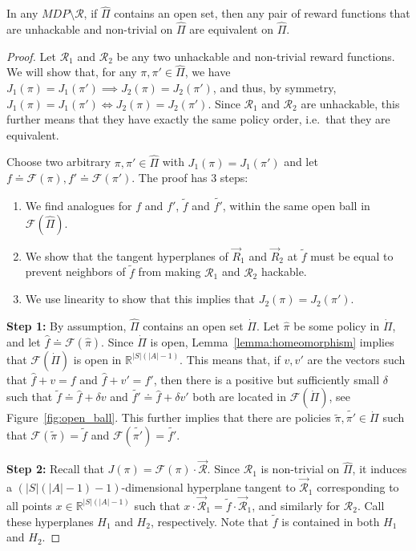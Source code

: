 \begin{theorem} %
In any $MDP \setminus \mathcal{R}$, if $\hat{\Pi}$ contains an open set, then any pair of reward functions that are unhackable and non-trivial on $\hat{\Pi}$ are equivalent on $\hat{\Pi}$.
\end{theorem}
\begin{proof}

Let $\mathcal{R}_1$ and $\mathcal{R}_2$ be any two unhackable and non-trivial reward functions.
We will show that, for any $\pi, \pi' \in \hat{\Pi}$, we have $J_1(\pi) = J_1(\pi') \implies J_2(\pi) = J_2(\pi')$, and thus, by symmetry, $J_1(\pi) = J_1(\pi') \iff J_2(\pi) = J_2(\pi')$.
Since $\mathcal{R}_1$ and $\mathcal{R}_2$ are unhackable, this further means that they have exactly the same policy order, i.e.\ that they are equivalent. %

Choose two arbitrary $\pi, \pi' \in \hat{\Pi}$ with $J_1(\pi) = J_1(\pi')$ and let $f \doteq \mathcal{F}(\pi), f' \doteq \mathcal{F}(\pi')$.
The proof has 3 steps:%
\begin{enumerate}
    \item We find analogues for $f$ and $f'$, $\tilde{f}$ and $\tilde{f'}$, within the same open ball in $\mathcal{F}(\hat{\Pi})$. %
    \item We show that the tangent hyperplanes of $\vec{R}_1$ and $\vec{R}_2$ at $\tilde{f}$ must be equal to prevent neighbors of $\tilde{f}$ from making $\mathcal{R}_1$ and $\mathcal{R}_2$ hackable.
    \item We use linearity to show that this implies that $J_2(\pi) = J_2(\pi')$.
\end{enumerate}

\textbf{Step 1:}
By assumption, $\hat{\Pi}$ contains an open set $\dot{\Pi}$. Let $\hat{\pi}$ be some policy in $\dot{\Pi}$, and let $\hat{f} \doteq \mathcal{F}(\hat{\pi})$. Since $\dot{\Pi}$ is open, Lemma~\ref{lemma:homeomorphism} implies that $\mathcal{F}(\dot{\Pi})$ is open in $\mathbb{R}^{|S|(|A|-1)}$.
This means that, if $v, v'$ are the vectors such that $\hat{f} + v = f$ and $\hat{f} + v' = f'$, then there is a positive but sufficiently small $\delta$ such that $\tilde{f} \doteq \hat{f} + \delta v$ and $\tilde{f'} \doteq \hat{f} + \delta v'$ both are located in $\mathcal{F}(\dot{\Pi})$, see Figure~\ref{fig:open_ball}.
This further implies that there are policies $\tilde{\pi}, \tilde{\pi'} \in \dot{\Pi}$ such that $\mathcal{F}(\tilde{\pi}) = \tilde{f}$ and $\mathcal{F}(\tilde{\pi'}) = \tilde{f'}$.


\textbf{Step 2:}
Recall that $J(\pi) = \mathcal{F}(\pi) \cdot \vec{\mathcal{R}}$. %
Since $\mathcal{R}_1$ is non-trivial on $\hat{\Pi}$, it induces a \linebreak $(|S|(|A|-1) - 1)$-dimensional hyperplane tangent to $\vec{\mathcal{R}}_1$ corresponding to all points $x \in \mathbb{R}^{|S|(|A|-1)}$ such that $x \cdot \vec{\mathcal{R}}_1 = \tilde{f} \cdot \vec{\mathcal{R}}_1$, and similarly for $\mathcal{R}_2$.
Call these hyperplanes $H_1$ and $H_2$, respectively.
Note that $\tilde{f}$ is contained in both $H_1$ and $H_2$.



\end{proof}
